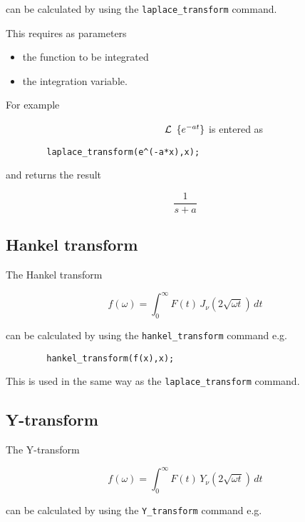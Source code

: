 can be calculated by using the \verb+laplace_transform+ command.

This requires as parameters

\begin{itemize}
\item the function to be integrated
\item the integration variable.
\end{itemize}

For example

$\hspace{56 mm} \cal L$ $\{e^{-at}\} \\$
is entered as

\begin{verbatim}
        laplace_transform(e^(-a*x),x);
\end{verbatim}

and returns the result
 
\begin{displaymath}
\frac{1}{s+a}
\end{displaymath}

\subsection{Hankel transform}

The Hankel transform

\begin{displaymath}
f(\omega) = \int_{0}^{\infty} F(t) \,J_{\nu}(2\sqrt{\omega t}) \,dt 
\end{displaymath}

can be calculated by using the \verb+hankel_transform+ command e.g.

\begin{verbatim}
        hankel_transform(f(x),x);
\end{verbatim}

This is used in the same way as the \verb+laplace_transform+ command.

\subsection{Y-transform}

The Y-transform

\begin{displaymath}
f(\omega) = \int_{0}^{\infty} F(t) \,Y_{\nu}(2\sqrt{\omega t}) \,dt 
\end{displaymath}

can be calculated by using the \verb+Y_transform+ command e.g.

